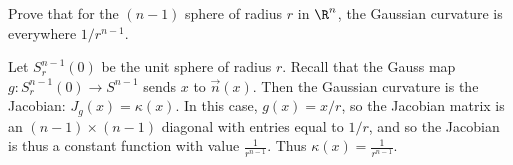 \documentclass[11pt,letterpaper]{article}
\begin{document}
\begin{cproblem}{5}
    Prove that for the $(n-1)$ sphere of radius $r$ in $\R^n$, the Gaussian curvature is everywhere $1 /r^{n-1}$.
\end{cproblem}

\begin{solution}
    \quad Let $S^{n-1}_r(0)$ be the unit sphere of radius $r$. Recall that the Gauss map $g : S^{n-1}_r(0) \to S^{n-1}$ sends $x$ to $\vec{n}(x)$. Then the Gaussian curvature is the Jacobian: $J_g(x) = \kappa(x)$. In this case, $g(x)=x /r$, so the Jacobian matrix is an $(n-1)\times (n-1)$ diagonal with entries equal to $1 /r$, and so the Jacobian is thus a constant function with value $\frac{1}{r^{n-1}}$. Thus $\kappa(x) = \frac{1}{r^{n-1}}$.
\end{solution}
\end{document}
